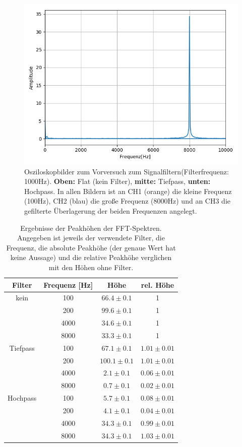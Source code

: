 \documentclass[12pt,a4paper]{article}
\begin{document}
\begin{figure}
\includegraphics[scale=0.5]{Bilder/Vorversuch3/Vor3_5.png}
\caption{Osziloskopbilder zum Vorversuch zum Signalfiltern(Filterfrequenz: 1000Hz). \textbf{Oben:} Flat (kein Filter), \textbf{mitte:} Tiefpass, \textbf{unten:} Hochpass.
In allen Bildern ist an CH1 (orange) die kleine Frequenz (100Hz), CH2 (blau) die große Frequenz (8000Hz) und an CH3 die gefilterte Überlagerung der beiden Frequenzen angelegt.}
\label{fig:Vor3_Oszi2}
\end{figure}

\begin{table}
\centering
\begin{tabular}{|c|c|c|c|}
\hline
Filter & Frequenz [Hz] & Höhe & rel. Höhe\\
\hline
kein & 100 & $66.4\pm 0.1$ & 1\\
\cline{2-4}
& 200 & $99.6\pm 0.1$ & 1\\
\cline{2-4}
& 4000 & $34.6\pm 0.1$ & 1\\
\cline{2-4}
& 8000 & $33.3\pm 0.1$ & 1\\
\hline
\hline
Tiefpass & 100 & $67.1\pm 0.1$ & $1.01\pm 0.01$\\
\cline{2-4}
& 200 & $100.1\pm 0.1$ & $1.01\pm 0.01$\\
\cline{2-4}
& 4000 & $2.1\pm 0.1$ & $0.06\pm 0.01$\\
\cline{2-4}
& 8000 & $0.7\pm 0.1$ & $0.02\pm 0.01$\\
\hline
\hline
Hochpass & 100 & $5.7\pm 0.1$ & $0.08\pm 0.01$\\
\cline{2-4}
& 200 & $4.1\pm 0.1$ & $0.04\pm 0.01$\\
\cline{2-4}
& 4000 & $34.3\pm 0.1$ & $0.99\pm 0.01$\\
\cline{2-4}
& 8000 & $34.3\pm 0.1$ & $1.03\pm 0.01$\\
\hline
\end{tabular} 
\caption{Ergebnisse der Peakhöhen der FFT-Spektren. Angegeben ist jeweils der verwendete Filter, die Frequenz, die absolute Peakhöhe (der genaue Wert hat keine Aussage) und die relative Peakhöhe verglichen mit den Höhen ohne Filter.}
\label{tab:Peakhohen}
\end{table}
\end{document}
